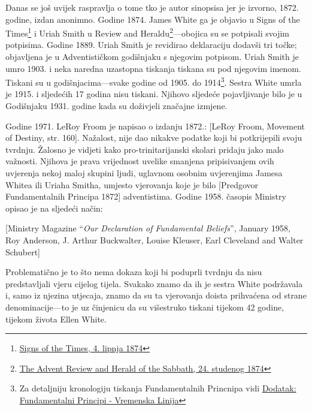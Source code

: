 Danas se još uvijek raspravlja o tome tko je autor sinopsisa jer je izvorno, 1872. godine, izdan anonimno. Godine 1874. James White ga je objavio u Signs of the Times\footnote{\href{https://adventistdigitallibrary.org/adl-364148/signs-times-june-4-1874}{Signs of the Times, 4. lipnja 1874}} i Uriah Smith u Review and Heraldu\footnote{\href{http://documents.adventistarchives.org/Periodicals/RH/RH18741124-V44-22.pdf}{The Advent Review and Herald of the Sabbath, 24. studenog 1874}}—obojica su se potpisali svojim potpisima. Godine 1889. Uriah Smith je revidirao deklaraciju dodavši tri točke; objavljena je u Adventističkom godišnjaku s njegovim potpisom. Uriah Smith je umro 1903. i neka naredna uzastopna tiskanja  tiskana su pod njegovim imenom. Tiskani su u godišnjacima—svake godine od 1905. do 1914\footnote{Za detaljniju kronologiju tiskanja Fundamentalnih Princnipa vidi \hyperref[appendix:timeline]{Dodatak: Fundamentalni Principi - Vremenska Linija}}. Sestra White umrla je 1915. i sljedećih 17 godina  nisu tiskani. Njihovo sljedeće pojavljivanje bilo je u Godišnjaku 1931. godine kada su doživjeli značajne izmjene.

Godine 1971. LeRoy Froom je napisao o izdanju 1872.: [LeRoy Froom, Movement of Destiny, str. 160]. Nažalost, nije dao nikakve podatke koji bi potkrijepili svoju tvrdnju. Žalosno je vidjeti kako pro-trinitarijanski skolari pridaju  jako malo važnosti. Njihova je prava vrijednost uvelike smanjena pripisivanjem ovih uvjerenja nekoj maloj skupini ljudi, uglavnom osobnim uvjerenjima Jamesa Whitea ili Uriaha Smitha, umjesto vjerovanja koje je bilo [Predgovor Fundamentalnih Principa 1872] adventistima. Godine 1958. časopis Ministry opisao je  na sljedeći način:

[Ministry Magazine “\textit{Our Declaration of Fundamental Beliefs}”, January 1958, Roy Anderson, J. Arthur Buckwalter, Louise Kleuser, Earl Cleveland and Walter Schubert]

Problematično je to što nema dokaza koji bi poduprli tvrdnju da  nisu predstavljali vjeru cijelog tijela. Svakako znamo da ih je sestra White podržavala i, samo iz njezina utjecaja, znamo da su ta vjerovanja doista prihvaćena od strane denominacije—to je uz činjenicu da su višestruko tiskani tijekom 42 godine, tijekom života Ellen White.

